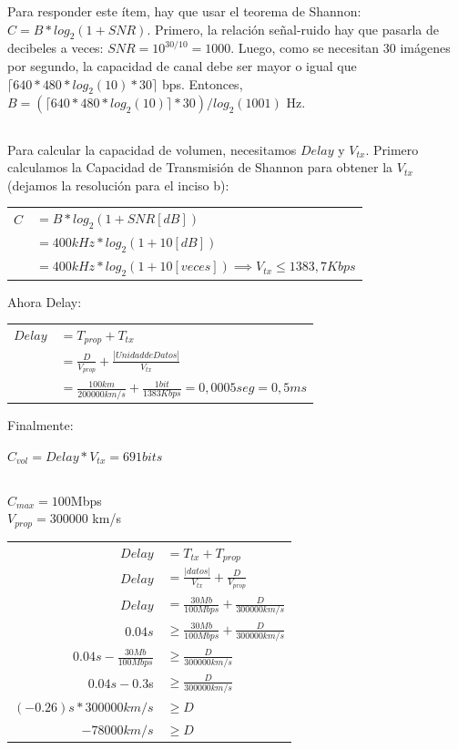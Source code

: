 \subsubsection{}
Para responder este ítem, hay que usar el teorema de Shannon: $C = B * log_2(1 + SNR)$. Primero, la relación señal-ruido hay que pasarla de decibeles a veces: $SNR = 10^{30/10} = 1000$. Luego, como se necesitan 30 imágenes por segundo, la capacidad de canal debe ser mayor o igual que $\lceil 640 * 480 * log_2(10) * 30 \rceil$ bps. Entonces, $B = (\lceil 640 * 480 * log_2(10) \rceil * 30)/ log_2(1001)$ Hz.

\subsection{}
Para calcular la capacidad de volumen, necesitamos $Delay$ y $V_{tx}$. Primero calculamos la Capacidad de Transmisión de Shannon para obtener la $V_{tx}$ (dejamos la resolución para el inciso b):

\begin{tabular}{rl}
$C$ & $= B * log_2(1 + SNR[dB])$ \\
& $= 400kHz * log_2(1 + 10[dB])$ \\
& $= 400kHz * log_2(1 + 10[veces]) \implies V_{tx} \leq 1383,7Kbps$ \\
\end{tabular}

Ahora Delay:

\begin{tabular}{rl}
$Delay$ & $= T_{prop} + T_{tx}$ \\
& $= \frac{D}{V_{prop}} + \frac{|Unidad de Datos|}{V_{tx}}$ \\
& $= \frac{100km}{200000km/s} + \frac{1bit}{1383Kbps} = 0,0005seg = 0,5ms$ \\
\end{tabular}

Finalmente:

$C_{vol} = Delay * V_{tx} = 691bits$

\subsection{}
$C_{max} = 100$Mbps \\
$V_{prop} = 300000$ km/s \\

\begin{tabular}{rl}
$Delay$ & $= T_{tx} + T_{prop}$ \\
$Delay$ & $= \frac{|datos|}{V_{tx}} + \frac{D}{V_{prop}}$ \\
$Delay$ & $= \frac{30Mb}{100Mbps} + \frac{D}{300000km/s}$ \\
$0.04s$ & $\geq \frac{30Mb}{100Mbps} + \frac{D}{300000km/s}$ \\
$0.04s - \frac{30Mb}{100Mbps}$ & $\geq \frac{D}{300000km/s}$ \\
$0.04s - 0.3$s & $\geq \frac{D}{300000km/s}$ \\
$(- 0.26)s * 300000km/s$ & $\geq D$ \\
$-78000km/s$ & $\geq D$ \\
\end{tabular}

